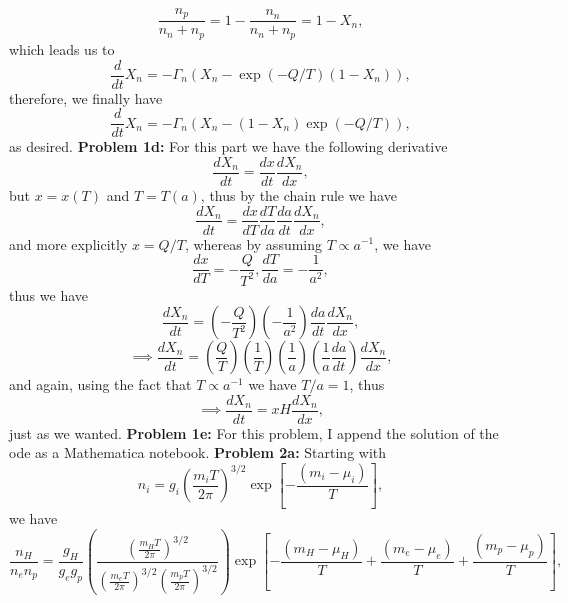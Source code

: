 \documentclass[11pt]{article}
\begin{document}
\begin{displaymath}
  \frac{n_p}{n_n +n_p} = 1 - \frac{n_n}{n_n +n_p}= 1 - X_n,
\end{displaymath}
which leads us to 
\begin{displaymath}
\frac{d}{dt} X_n = -\Gamma_n \left( X_n - \exp(-Q/T) (1 - X_n)\right),  
\end{displaymath}
therefore, we finally have
\begin{displaymath}
\frac{d}{dt} X_n = -\Gamma_n \left( X_n - (1 - X_n)\exp(-Q/T)\right),
\end{displaymath}
as desired.
\newline
\textbf{Problem 1d:}
For this part we have the following derivative
\begin{displaymath}
  \frac{dX_n}{dt}=\frac{dx}{dt}\frac{dX_n}{dx},
\end{displaymath}
but $x = x(T)$ and $T=T(a)$, thus by the chain rule we have
\begin{displaymath}
 	\frac{dX_n}{dt}=\frac{dx}{dT}\frac{dT}{da}\frac{da}{dt}\frac{dX_n}{dx},
\end{displaymath}
and more explicitly $x=Q/T$, whereas by assuming $T\propto a^{-1}$, we have
\begin{displaymath}
 	\frac{dx}{dT} = -\frac{Q}{T^2}, \frac{dT}{da}= -\frac{1}{a^2}, 
\end{displaymath}
 thus we have
\begin{displaymath}
	\frac{dX_n}{dt}=\left(-\frac{Q}{T^2}\right)\left(-\frac{1}{a^2}\right)\frac{da}{dt}\frac{dX_n}{dx},  
\end{displaymath}
\begin{displaymath}
\implies\frac{dX_n}{dt}=\left(\frac{Q}{T}\right)\left(\frac{1}{T}\right)\left(\frac{1}{a}\right)\left(\frac{1}{a}\frac{da}{dt}\right)\frac{dX_n}{dx},
\end{displaymath}
and again, using the fact that $T\propto a^{-1}$ we have $T/a = 1$, thus
\begin{displaymath}
\implies\frac{dX_n}{dt}=xH\frac{dX_n}{dx},  
\end{displaymath}
just as we wanted.
\newline
\textbf{Problem 1e:}
For this problem, I append the solution of the ode as a Mathematica notebook.
\newpage
\textbf{Problem 2a:}
 Starting with
\begin{displaymath}
  n_i = g_i\left(\frac{m_i T}{2\pi}\right)^{3/2} \exp\left[ -\frac{(m_i -\mu_i)}{T}\right],
\end{displaymath}
we have
\begin{displaymath}
  \frac{n_H}{n_e n_p} = \frac{g_H}{g_e g_p}\left( \frac{\left(\frac{m_H T}{2\pi}\right)^{3/2} }{\left(\frac{m_e T}{2\pi}\right)^{3/2} \left(\frac{m_p T}{2\pi}\right)^{3/2} }\right)\exp\left[ -\frac{(m_H -\mu_H)}{T} +\frac{(m_e -\mu_e)}{T}+\frac{(m_p -\mu_p)}{T} \right],
\end{displaymath}
\end{document}
